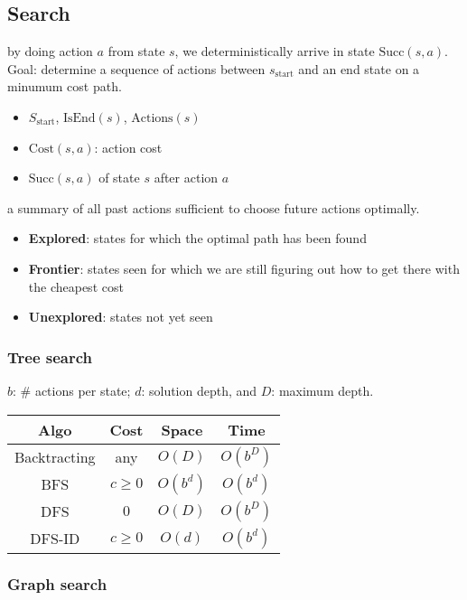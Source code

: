 \subsection{Search}

 by doing action $a$ from state $s$, we deterministically
arrive in state $\text{Succ}(s,a)$. Goal: determine a sequence of actions
between $s_{\text{start}}$ and an end state on a minumum cost path.
\begin{itemize}
    \item $S_\text{start}$, $\text{IsEnd}(s)$, $\text{Actions}(s)$
    \item $\text{Cost}(s,a)$: action cost
    \item $\text{Succ}(s,a)$ of state $s$ after action $a$
\end{itemize}

 a summary of all past actions sufficient to choose future actions optimally.

\begin{itemize}
    \item \textbf{Explored}: states for which the optimal path has been found
    \item \textbf{Frontier}: states seen for which we are still figuring out how to get there with the cheapest cost
    \item \textbf{Unexplored}: states not yet seen
\end{itemize}

\subsubsection{Tree search}

 $b$: \# actions per state; $d$: solution depth, and $D$:
maximum depth.
\begin{tabular}{|c|c|c|c|} 
    \hline
    \textbf{Algo}  & \textbf{Cost} & \textbf{Space} & \textbf{Time} \\
    \hline
    Backtracting & any & $O(D)$ & $O(b^D)$ \\ 
    \hline
    BFS & $c \ge 0$ & $O(b^d)$ & $O(b^d)$ \\
    \hline
    DFS & $0$ & $O(D)$ & $O(b^D)$ \\
    \hline
    DFS-ID & $c \ge 0$ & $O(d)$ & $O(b^d)$ \\
    \hline
\end{tabular}

\subsubsection{Graph search}

